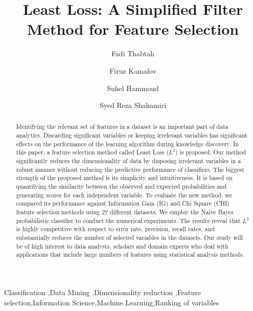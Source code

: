 \documentclass[review]{elsarticle}
\begin{document}
\begin{frontmatter}

\title{Least Loss: A Simplified Filter Method for Feature Selection}



\author[fadi.address]{Fadi Thabtah }

\author[firuz.address]{Firuz Kamalov}

\author[suhel.address]{Suhel Hammoud}

\author[syed.address]{Syed Reza Shahamiri}

\address[fadi.address]{Digital Technologies, Manukau Institute of Technology}
\address[firuz.address]{Mathematics department, Canadian University of Dubai, Dubai, UAE}
\address[suhel.address]{IT Department, University of Kalamoon, Syria}
\address[syed.address]{Digital Technologies, Manukau Institute of Technology}



\begin{abstract}
Identifying the relevant set of features in a dataset is an important part of data analytics.  Discarding significant variables or keeping irrelevant variables has significant effects on the performance of the learning algorithm during knowledge discovery. In this paper, a feature selection method called Least Loss ($ L^2 $) is proposed. Our method significantly reduces the dimensionality of data by disposing irrelevant variables in a robust manner without reducing the predictive performance of classifiers. The biggest strength of the proposed method is its simplicity and intuitiveness. It is based on quantifying the similarity between the observed and expected probabilities and generating scores for each independent variable. To evaluate the new method, we compared its performance against Information Gain (IG) and Chi Square (CHI) feature selection methods using 27 different datasets. We employ the Naïve Bayes probabilistic classifier to conduct the numerical experiments. The results reveal that $ L^2 $ is highly competitive with respect to error rate, precision, recall rates, and substantially reduces the number of selected variables in the datasets. Our study will be of high interest to data analysts, scholars and domain experts who deal with applications that include large numbers of features using statistical analysis methods. 
\end{abstract}

\begin{keyword}
Classification \sep Data Mining \sep Dimensionality reduction \sep Feature selection\sep Information Science\sep Machine Learning\sep Ranking of variables

\end{keyword}

\end{frontmatter}
\end{document}
